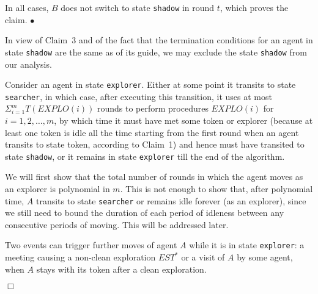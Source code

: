 \documentclass[11pt]{article}
\newcommand{\finclaim}{\hfill $\bullet$}
\newcommand{\qed}{\hfill $\Box$ \bigbreak}
\newenvironment{proof}{\noindent {\bf Proof.}}{\qed}
\begin{document}
\begin{proof}
\begin{itemize}
\begin{itemize}
\end{itemize}
 
\end{itemize}

{In all cases, $B$ does not switch to state {\tt shadow} in round $t$, which proves the claim.} \finclaim

{In view of Claim~3 and of the fact that} the termination  conditions for an agent in state 
 {\tt shadow} are the same as of its guide, we may exclude the state {\tt shadow} from our analysis.



Consider an agent in state {\tt explorer}. Either at some point it transits to state {\tt searcher}, in which case, after executing this transition,  it uses at most $\Sigma_{i=1} ^m T(EXPLO(i))$ rounds to perform procedures $EXPLO(i)$
 for $i=1,2,\dots, m$, by which time it must have met some token or explorer {(because at least one token is idle all the time starting from the first round when an agent transits to state token, according to Claim~1)} and hence must have transited to state {\tt shadow},
 or it remains in state {\tt explorer} till the end of the algorithm.
 
{ We will first show that the total number of rounds in which the agent moves as an explorer is polynomial in $m$. This is not enough to show that, after polynomial time, $A$ transits to state {\tt searcher} or remains idle forever (as an explorer), since we still need to bound the duration of each period of idleness
 between any consecutive periods of moving. This will be addressed later.}
 
{Two events can trigger further moves of agent $A$ while it is in state {\tt explorer}}: a meeting causing a non-clean exploration
 $EST^*$ or a visit of $A$ by some agent, when $A$ stays with its token after a clean exploration. 
 

\end{proof}
\end{document}
